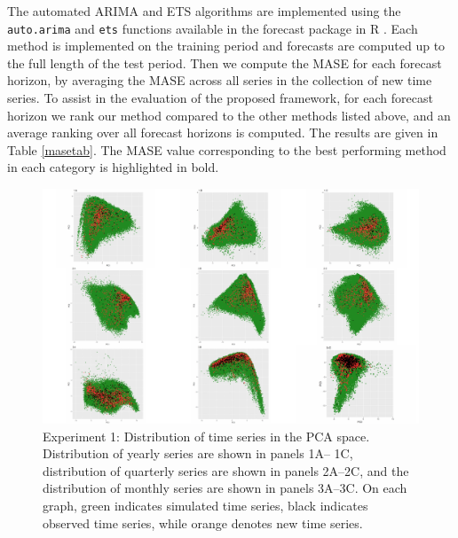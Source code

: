 \documentclass[11pt,a4paper,]{article}
\theoremstyle{definition}
\theoremstyle{definition}
\theoremstyle{definition}
\theoremstyle{remark}
\begin{document}
The automated ARIMA and ETS algorithms are implemented using the
\texttt{auto.arima} and \texttt{ets} functions available in the forecast
package in R \autocite{forecast}. Each method is implemented on the
training period and forecasts are computed up to the full length of the
test period. Then we compute the MASE for each forecast horizon, by
averaging the MASE across all series in the collection of new time
series. To assist in the evaluation of the proposed framework, for each
forecast horizon we rank our method compared to the other methods listed
above, and an average ranking over all forecast horizons is computed.
The results are given in Table \ref{masetab}. The MASE value
corresponding to the best performing method in each category is
highlighted in bold.

\begin{figure}

{\centering \includegraphics[width=\textwidth]{figure/exp1-1} 

}

\caption{Experiment 1: Distribution of time series in the PCA space. Distribution of yearly series are shown in panels 1A-- 1C, distribution of quarterly series are shown in panels 2A--2C, and the distribution of monthly series are shown in panels 3A--3C. On each graph, green indicates simulated time series, black indicates observed time series, while orange denotes new time series.}\label{fig:exp1}
\end{figure}
\end{document}
